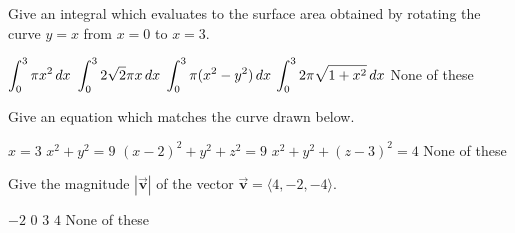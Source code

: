 \documentclass[12pt]{exam}
\newcommand{\ds}{\ensuremath{\displaystyle}}
\newcommand{\harpvec}[1]{\overrightarrow{\ensuremath{\mathbf{#1}}}}
\newcommand{\<}{\langle}
\renewcommand{\>}{\rangle}
\begin{document}
\begin{center}
\end{center}
\vspace{0.1in}

\begin{questions}

\setcounter{question}{0}
\question[10]
Give an integral which evaluates to the surface area obtained by rotating
the curve $y=x$ from $x=0$ to $x=3$.

\begin{checkboxes}
\choice $\ds\int_0^3 \pi x^2 \,dx$
\CorrectChoice $\ds\int_0^3 2\sqrt{2}\pi x\,dx$
\choice $\ds\int_0^3 \pi (x^2 - y^2) \,dx$
\choice $\ds\int_0^3 2\pi \sqrt{1+x^2}\,dx$
\choice None of these
\end{checkboxes}

\vfill

\question[10]
Give an equation which matches the curve drawn below.


\begin{checkboxes}
\choice $x=3$
\choice $x^2+y^2=9$
\choice $(x-2)^2+y^2+z^2=9$
\CorrectChoice $x^2+y^2+(z-3)^2=4$
\choice None of these
\end{checkboxes}

\vfill

\question[10]
Give the magnitude $|\harpvec{v}|$ of the vector $\harpvec{v}=\<4,-2,-4\>$.

\begin{checkboxes}
\choice $-2$
\choice $0$
\CorrectChoice $3$
\choice $4$
\choice None of these
\end{checkboxes}

\vfill

\end{questions}
\end{document}

